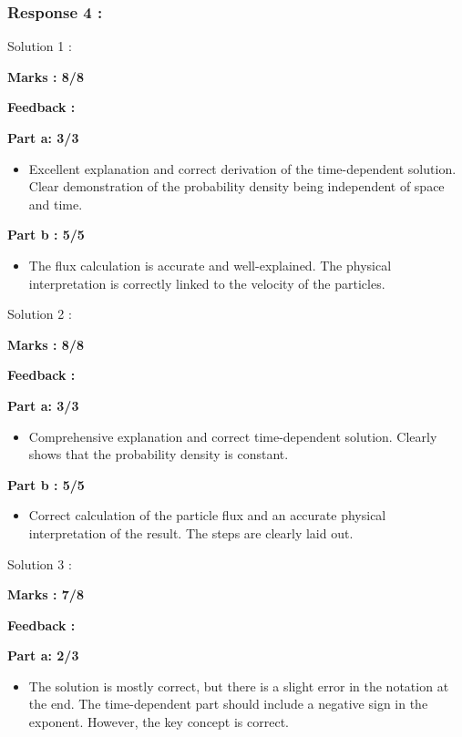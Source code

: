 \documentclass[a4paper,11pt]{article}
\begin{document}
\subsubsection*{Response 4 :}

Solution 1 :

\textbf{Marks : 8/8}

\textbf{Feedback :}

\textbf{Part a: 3/3}
\begin{itemize}
    \item Excellent explanation and correct derivation of the time-dependent solution. Clear demonstration of the probability density being independent of space and time.
\end{itemize}

\textbf{Part b : 5/5}

\begin{itemize}
    \item The flux calculation is accurate and well-explained. The physical interpretation is correctly linked to the velocity of the particles.
\end{itemize}


Solution 2 :

\textbf{Marks : 8/8}

\textbf{Feedback :}

\textbf{Part a: 3/3}
\begin{itemize}
    \item Comprehensive explanation and correct time-dependent solution. Clearly shows that the probability density is constant.
\end{itemize}

\textbf{Part b : 5/5}

\begin{itemize}
    \item Correct calculation of the particle flux and an accurate physical interpretation of the result. The steps are clearly laid out.
\end{itemize}



Solution 3 :

\textbf{Marks : 7/8}

\textbf{Feedback :}

\textbf{Part a: 2/3}
\begin{itemize}
    \item The solution is mostly correct, but there is a slight error in the notation at the end. The time-dependent part should include a negative sign in the exponent. However, the key concept is correct.
\end{itemize}
\end{document}

